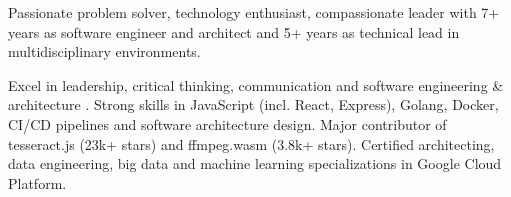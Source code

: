 

\begin{cvparagraph}

Passionate problem solver, technology enthusiast, compassionate leader with 7+ years as software engineer and architect and 5+ years as technical lead in multidisciplinary environments.

  Excel in leadership, critical thinking, communication and software engineering \& architecture . Strong skills in JavaScript (incl. React, Express), Golang, Docker, CI/CD pipelines and software architecture design. Major contributor of tesseract.js (23k+ stars) and ffmpeg.wasm (3.8k+ stars). Certified architecting, data engineering, big data and machine learning specializations in Google Cloud Platform. 
\end{cvparagraph}
